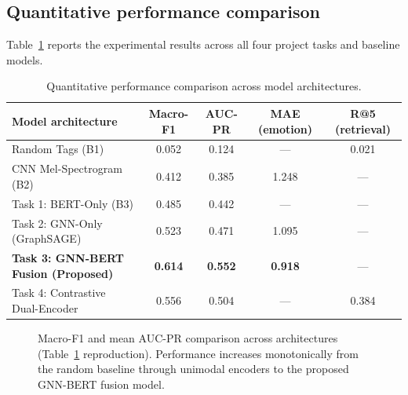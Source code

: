 \documentclass[10pt]{article}
\begin{document}
\subsection{Quantitative performance comparison}

Table~\ref{tab:results} reports the experimental results across all four project tasks and baseline models.

\begin{table}[t]
  \caption{Quantitative performance comparison across model architectures.}
  \label{tab:results}
  \centering
  \begin{tabular}{lcccc}
    \toprule
    Model architecture & Macro-F1 & AUC-PR & MAE (emotion) & R@5 (retrieval) \\
    \midrule
    Random Tags (B1)                        & 0.052 & 0.124 & ---   & 0.021 \\
    CNN Mel-Spectrogram (B2)                & 0.412 & 0.385 & 1.248 & --- \\
    Task 1: BERT-Only (B3)                  & 0.485 & 0.442 & ---   & --- \\
    Task 2: GNN-Only (GraphSAGE)            & 0.523 & 0.471 & 1.095 & --- \\
    \textbf{Task 3: GNN-BERT Fusion (Proposed)} & \textbf{0.614} & \textbf{0.552} & \textbf{0.918} & --- \\
    Task 4: Contrastive Dual-Encoder        & 0.556 & 0.504 & ---   & 0.384 \\
    \bottomrule
  \end{tabular}
\end{table}

\begin{figure}[t]
  \centering
  \caption{Macro-F1 and mean AUC-PR comparison across architectures (Table~\ref{tab:results} reproduction). Performance increases monotonically from the random baseline through unimodal encoders to the proposed GNN-BERT fusion model.}
  \label{fig:barchart}
\end{figure}
\end{document}
